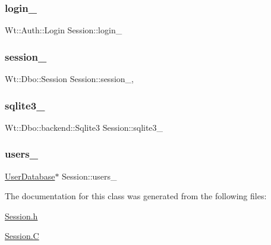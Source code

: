 \subsubsection{\texorpdfstring{login\+\_\+}{login\_}}
{\footnotesize\ttfamily Wt\+::\+Auth\+::\+Login Session\+::login\+\_\+\hspace{0.3cm}{\ttfamily [private]}}

\mbox{\label{class_session_a7de9be5226d297784ae26a79a1267ac2}} 
\subsubsection{\texorpdfstring{session\+\_\+}{session\_}}
{\footnotesize\ttfamily Wt\+::\+Dbo\+::\+Session Session\+::session\+\_\+\hspace{0.3cm}{\ttfamily [mutable]}, {\ttfamily [private]}}

\mbox{\label{class_session_a15a7b5a56a15bff8eed8cf98c87abcd3}} 
\subsubsection{\texorpdfstring{sqlite3\+\_\+}{sqlite3\_}}
{\footnotesize\ttfamily Wt\+::\+Dbo\+::backend\+::\+Sqlite3 Session\+::sqlite3\+\_\+\hspace{0.3cm}{\ttfamily [private]}}

\mbox{\label{class_session_a791c538e6bb5214c72b974329c419274}} 
\subsubsection{\texorpdfstring{users\+\_\+}{users\_}}
{\footnotesize\ttfamily \hyperlink{_session_8h_a34c01062ebe1a5567ef968ff473f0354}{User\+Database}$\ast$ Session\+::users\+\_\+\hspace{0.3cm}{\ttfamily [private]}}



The documentation for this class was generated from the following files\+:\begin{DoxyCompactItemize}
\item 
\hyperlink{_session_8h}{Session.\+h}\item 
\hyperlink{_session_8_c}{Session.\+C}\end{DoxyCompactItemize}
